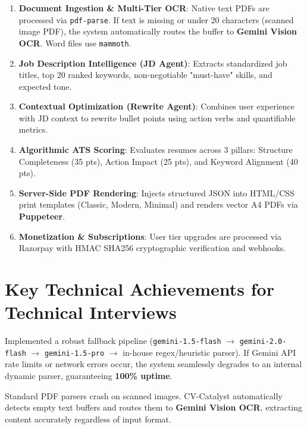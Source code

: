 \documentclass[11pt,a4paper]{article}
\begin{document}
\begin{enumerate}
    \item \textbf{Document Ingestion \& Multi-Tier OCR}: Native text PDFs are processed via \texttt{pdf-parse}. If text is missing or under 20 characters (scanned image PDF), the system automatically routes the buffer to \textbf{Gemini Vision OCR}. Word files use \texttt{mammoth}.
    \item \textbf{Job Description Intelligence (JD Agent)}: Extracts standardized job titles, top 20 ranked keywords, non-negotiable "must-have" skills, and expected tone.
    \item \textbf{Contextual Optimization (Rewrite Agent)}: Combines user experience with JD context to rewrite bullet points using action verbs and quantifiable metrics.
    \item \textbf{Algorithmic ATS Scoring}: Evaluates resumes across 3 pillars: Structure Completeness (35 pts), Action Impact (25 pts), and Keyword Alignment (40 pts).
    \item \textbf{Server-Side PDF Rendering}: Injects structured JSON into HTML/CSS print templates (Classic, Modern, Minimal) and renders vector A4 PDFs via \textbf{Puppeteer}.
    \item \textbf{Monetization \& Subscriptions}: User tier upgrades are processed via Razorpay with HMAC SHA256 cryptographic verification and webhooks.
\end{enumerate}

\section{Key Technical Achievements for Technical Interviews}

\begin{tcolorbox}[colback=blue!5,colframe=blue!75!black,title=\textbf{1. Multi-Model LLM Resilience \& Fallback Chain}]
Implemented a robust fallback pipeline (\texttt{gemini-1.5-flash} $\rightarrow$ \texttt{gemini-2.0-flash} $\rightarrow$ \texttt{gemini-1.5-pro} $\rightarrow$ in-house regex/heuristic parser). If Gemini API rate limits or network errors occur, the system seamlessly degrades to an internal dynamic parser, guaranteeing \textbf{100\% uptime}.
\end{tcolorbox}

\begin{tcolorbox}[colback=green!5,colframe=green!60!black,title=\textbf{2. Dual-Mode Document OCR Extraction}]
Standard PDF parsers crash on scanned images. CV-Catalyst automatically detects empty text buffers and routes them to \textbf{Gemini Vision OCR}, extracting content accurately regardless of input format.
\end{tcolorbox}
\end{document}
